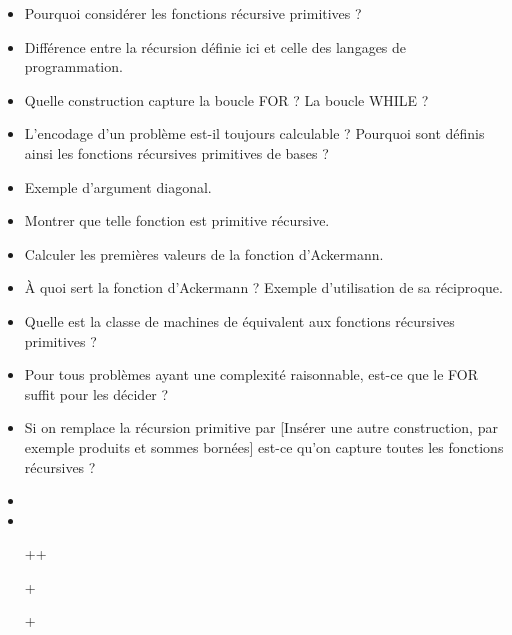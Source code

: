 \documentclass{agregfiche}
\begin{document}
\begin{itemize}
	\item Pourquoi considérer les fonctions récursive primitives ? %
	\item Différence entre la récursion définie ici et celle des langages de programmation.
        \item Quelle construction capture la boucle FOR ? La boucle WHILE
          ?
	\item L'encodage d'un problème est-il toujours calculable ?
          Pourquoi sont définis ainsi les fonctions récursives primitives
          de bases ?
	\item Exemple d'argument diagonal.
	\item Montrer que telle fonction est primitive récursive.
        \item Calculer les premières valeurs de la fonction d'Ackermann.
        \item À quoi sert la fonction d'Ackermann ? Exemple d'utilisation de sa réciproque.
        \item Quelle est la classe de machines de  équivalent aux fonctions récursives primitives ? %
        \item Pour tous problèmes ayant une complexité raisonnable,
          est-ce que le FOR suffit pour les décider ?
        \item Si on remplace la récursion primitive par [Insérer une autre construction, par exemple produits et sommes bornées] est-ce qu'on capture toutes les fonctions récursives ?
\end{itemize}

\secreferences

\begin{itemize}
\item 
\item 
\end{itemize}

\secdev

\begin{itemize}
    \item[++]  
    \item[+] 
    \item[+] 
\end{itemize}
\end{document}
